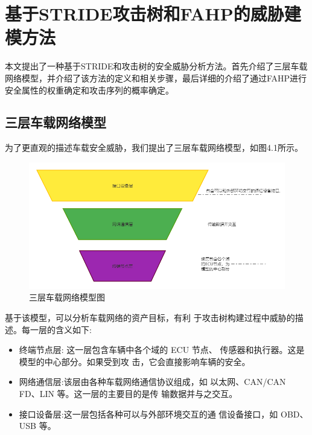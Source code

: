 \chapter{基于STRIDE攻击树和FAHP的威胁建模方法}
\label{ch4}
本文提出了一种基于STRIDE和攻击树的安全威胁分析方法。首先介绍了三层车载网络模型，并介绍了该方法的定义和相关步骤，最后详细的介绍了通过FAHP进行安全属性的权重确定和攻击序列的概率确定。
\section{三层车载网络模型}
为了更直观的描述车载安全威胁，我们提出了三层车载网络模型，如图4.1所示。
\begin{figure}
  \centering
  \includegraphics[scale=0.5]{resources/img/c4.jpg}
  \caption{三层车载网络模型图}
\end{figure}
基于该模型，可以分析车载网络的资产目标，有利
于攻击树构建过程中威胁的描述。每一层的含义如下:
\begin{itemize}
  \item 终端节点层: 这一层包含车辆中各个域的 ECU 节点、
  传感器和执行器。这是模型的中心部分。如果受到攻
  击，它会直接影响车辆的安全。
  \item 网络通信层:该层由各种车载网络通信协议组成，如
  以太网、CAN/CAN FD、LIN 等。这一层的主要目的是传
  输数据并与之交互。
  \item 接口设备层:这一层包括各种可以与外部环境交互的通
  信设备接口，如 OBD、USB 等。
\end{itemize}
